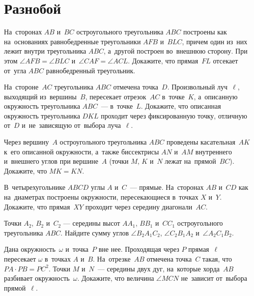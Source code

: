 
\section*{Разнобой}


\begin{problems}

\item
На~сторонах $AB$ и~$BC$ остроугольного треугольника $ABC$ построены как
на~основаниях равнобедренные треугольники $AFB$ и~$BLC$, причем один из~них
лежит внутри треугольника $ABC$, а~другой построен во~внешнюю сторону.
При этом $\angle AFB = \angle BLC$ и~$\angle CAF = \angle ACL$.
Докажите, что прямая~$FL$ отсекает от~угла
$ABC$ равнобедренный треугольник.

\item
На~стороне~$AC$ треугольника $ABC$ отмечена точка~$D$.
Произвольный луч~$\ell$, выходящий из~вершины~$B$, пересекает отрезок~$AC$
в~точке~$K$, а~описанную окружность треугольника $ABC$~--- в~точке~$L$.
Докажите, что описанная окружность треугольника $DKL$ проходит через
фиксированную точку, отличную от~$D$ и~не~зависящую от~выбора луча~$\ell$.

\item
Через вершину~$A$ остроугольного треугольника $ABC$ проведены касательная~$AK$
к~его описанной окружности, а~также биссектрисы $AN$ и~$AM$ внутреннего
и~внешнего углов при вершине~$A$ (точки $M$, $K$ и~$N$ лежат на~прямой~$BC$).
Докажите, что $MK = KN$.

\item
В~четырехугольнике $ABCD$ углы $A$ и~$C$~--- прямые.
На~сторонах $AB$ и~$CD$ как на~диаметрах построены окружности, пересекающиеся
в~точках $X$ и~$Y$.
Докажите, что прямая~$XY$ проходит через середину диагонали~$AC$.

\item
Точки $A_2$, $B_2$ и~$C_2$ --– середины высот $A A_1$, $B B_1$ и~$C C_1$
остроугольного треугольника $ABC$.
Найдите сумму углов
$\angle B_2 A_1 C_2$, $\angle C_2 B_1 A_2$ и~$\angle A_2 C_1 B_2$.

\item
Дана окружность~$\omega$ и~точка~$P$ вне нее.
Проходящая через $P$ прямая~$\ell$ пересекает $\omega$ в~точках $A$ и~$B$.
На~отрезке~$AB$ отмечена точка~$C$ такая, что $PA \cdot PB = PC^2$.
Точки $M$ и~$N$~--- середины двух дуг, на~которые хорда~$AB$ разбивает
окружность~$\omega$.
Докажите, что величина $\angle MCN$ не~зависит от~выбора прямой~$\ell$.

\end{problems}

